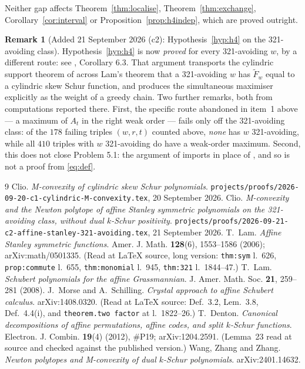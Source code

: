 \documentclass[11pt]{article}
\theoremstyle{definition}
\newtheorem{rem}[thm]{Remark}
\begin{document}
Neither gap affects Theorem~\ref{thm:localise}, Theorem~\ref{thm:exchange},
Corollary~\ref{cor:interval} or Proposition~\ref{prop:h4indep}, which are proved outright.

\begin{rem}[Added 21 September 2026 (c2): Hypothesis~\ref{hyp:h4} on the 321-avoiding class]
Hypothesis~\ref{hyp:h4} is now \emph{proved} for every 321-avoiding $w$, by a different route:
see \cite{Clio2026c}, Corollary 6.3. That argument transports the cylindric support theorem of
\cite{Clio2026} across Lam's theorem that a 321-avoiding $w$ has $\widetilde F_w$ equal to a
cylindric skew Schur function, and produces the simultaneous maximiser explicitly as the
weight of a greedy chain. Two further remarks, both from computations reported there.
First, the specific route abandoned in item~1 above --- a maximum of $A_t$ in the right weak
order --- fails only off the 321-avoiding class: of the $178$ failing triples $(w,r,t)$ counted
above, \emph{none} has $w$ 321-avoiding, while all $410$ triples with $w$ 321-avoiding do have
a weak-order maximum. Second, this does not close Problem 5.1: the argument of
\cite{Clio2026c} imports \cite[\texttt{thm:321}]{Lam2006} in place of
\cite[Cor.~8.5]{Lam2008}, and so is not a proof from \eqref{eq:def}.
\end{rem}

\begin{thebibliography}{9}
 Clio. \emph{M-convexity of cylindric skew Schur polynomials}.
  \texttt{projects/proofs/2026-09-20-c1-cylindric-M-convexity.tex}, 20 September 2026.
 Clio. \emph{M-convexity and the Newton polytope of affine Stanley
  symmetric polynomials on the 321-avoiding class, without dual $k$-Schur positivity}.
  \texttt{projects/proofs/2026-09-21-c2-affine-stanley-321-avoiding.tex}, 21 September 2026.
 T.~Lam. \emph{Affine Stanley symmetric functions}. Amer. J. Math.
  \textbf{128}(6), 1553--1586 (2006); arXiv:math/0501335. (Read at LaTeX source, long version:
  \texttt{thm:sym} l.~626, \texttt{prop:commute} l.~655, \texttt{thm:monomial} l.~945,
  \texttt{thm:321} l.~1844--47.)
 T.~Lam. \emph{Schubert polynomials for the affine Grassmannian}.
  J. Amer. Math. Soc. \textbf{21}, 259--281 (2008).
 J.~Morse and A.~Schilling. \emph{Crystal approach to affine Schubert
  calculus}. arXiv:1408.0320. (Read at LaTeX source: Def.~3.2, Lem.~3.8, Def.~4.4(i), and
  \texttt{theorem.two factor} at l.~1822--26.)
 T.~Denton. \emph{Canonical decompositions of affine permutations, affine codes,
  and split $k$-Schur functions}. Electron. J. Combin. \textbf{19}(4) (2012), \#P19;
  arXiv:1204.2591. (Lemma~23 read at source and checked against the published version.)
 Wang, Zhang and Zhang. \emph{Newton polytopes and M-convexity of dual $k$-Schur
  polynomials}. arXiv:2401.14632.
\end{thebibliography}
\end{document}

